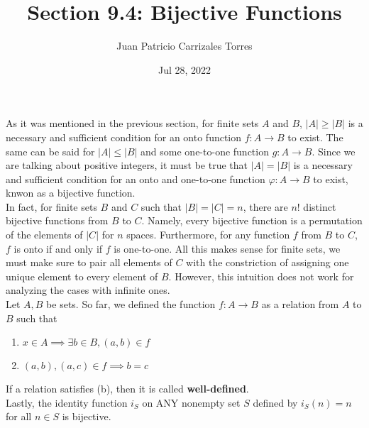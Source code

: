 \documentclass[12pt]{article}
\begin{document}
  
 \title{Section 9.4: Bijective Functions}
   \author{Juan Patricio Carrizales Torres}
     \date{Jul 28, 2022}
       \maketitle

       As it was mentioned in the previous section, for finite sets $A$ and $B$, $|A|\geq |B|$ is a necessary and sufficient condition for an onto function $f:A\to B$ to exist. The same can be said for $|A|\leq |B|$ and some one-to-one function $g:A\to B$. Since we are talking about positive integers, it must be true that $|A|=|B|$ is a necessary and sufficient condition for an onto and one-to-one function $\varphi:A\to B$ to exist, knwon as a bijective function. \\
       In fact, for finite sets $B$ and $C$ such that $|B|=|C|=n$, there are $n!$ distinct bijective functions from $B$ to $C$. Namely, every bijective function is a permutation of the elements of $|C|$ for $n$ spaces. Furthermore, for any function $f$ from $B$ to $C$, $f$ is onto if and only if $f$ is one-to-one. All this makes sense for finite sets, we must make sure to pair all elements of $C$ with the constriction of assigning one unique element to every element of $B$. However, this intuition does not work for analyzing the cases with infinite ones.\\
       Let $A,B$ be sets. So far, we defined the function $f:A\to B$ as a relation from $A$ to $B$ such that
    \begin{enumerate}
      \item $x\in A \implies \exists b\in B, (a,b)\in f$
      \item $(a,b),(a,c)\in f \implies b=c$
    \end{enumerate}
    If a relation satisfies (b), then it is called \textbf{well-defined}.\\
    Lastly, the identity function $i_{S}$ on ANY nonempty set $S$ defined by $i_{S}(n)=n$ for all $n\in S$ is bijective. 
       
\end{document}
